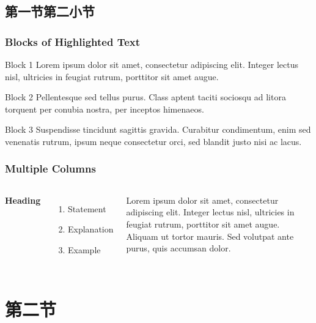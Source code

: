 \documentclass{beamer}
\numberwithin{thm}{section}
\numberwithin{defn}{section}
\numberwithin{lmm}{section}
\theoremstyle{example}
\numberwithin{figure}{section}
\numberwithin{table}{section}
\numberwithin{equation}{section}
\begin{document}
\subsection{第一节第二小节}
\begin{frame}
\frametitle{Blocks of Highlighted Text}
\begin{block}{Block 1}
Lorem ipsum dolor sit amet, consectetur adipiscing elit. Integer lectus nisl, ultricies in feugiat rutrum, porttitor sit amet augue.
\end{block}

\begin{exampleblock}{Block 2}
Pellentesque sed tellus purus. Class aptent taciti sociosqu ad litora torquent per conubia nostra, per inceptos himenaeos.
\end{exampleblock}

\begin{alertblock}{Block 3}
Suspendisse tincidunt sagittis gravida. Curabitur condimentum, enim sed venenatis rutrum, ipsum neque consectetur orci, sed blandit justo nisi ac lacus.
\end{alertblock}
\end{frame}


\begin{frame}
\frametitle{Multiple Columns}
\begin{columns}[c] %

\textbf{Heading}
\begin{enumerate}
\item Statement
\item Explanation
\item Example
\end{enumerate}

Lorem ipsum dolor sit amet, consectetur adipiscing elit. Integer lectus nisl, ultricies in feugiat rutrum, porttitor sit amet augue. Aliquam ut tortor mauris. Sed volutpat ante purus, quis accumsan dolor.

\end{columns}
\end{frame}

\section{第二节}
\end{document}
